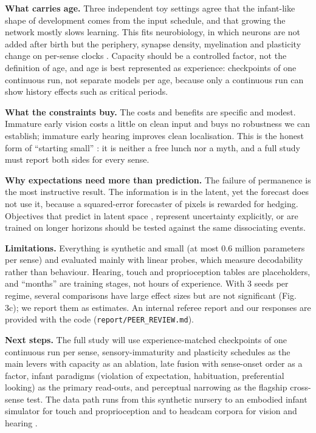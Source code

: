 \documentclass[
]{article}
\begin{document}
\textbf{What carries age.} Three independent toy settings agree that the
infant-like shape of development comes from the input schedule, and that
growing the network mostly slows learning. This fits neurobiology, in
which neurons are not added after birth but the periphery, synapse
density, myelination and plasticity change on per-sense clocks
\citep{huttenlocher1997regional, sydnor2021neurodevelopment, hensch2005critical}.
Capacity should be a controlled factor, not the definition of age, and
age is best represented as experience: checkpoints of one continuous
run, not separate models per age, because only a continuous run can show
history effects such as critical periods.

\textbf{What the constraints buy.} The costs and benefits are specific
and modest. Immature early vision costs a little on clean input and buys
no robustness we can establish; immature early hearing improves clean
localisation. This is the honest form of ``starting small''
\citep{elman1993learning, rohde1999language}: it is neither a free lunch
nor a myth, and a full study must report both sides for every sense.

\textbf{Why expectations need more than prediction.} The failure of
permanence is the most instructive result. The information is in the
latent, yet the forecast does not use it, because a squared-error
forecaster of pixels is rewarded for hedging. Objectives that predict in
latent space \citep{garrido2025intuitive}, represent uncertainty
explicitly, or are trained on longer horizons should be tested against
the same dissociating events.

\textbf{Limitations.} Everything is synthetic and small (at most 0.6
million parameters per sense) and evaluated mainly with linear probes,
which measure decodability rather than behaviour. Hearing, touch and
proprioception tables are placeholders, and ``months'' are training
stages, not hours of experience. With 3 seeds per regime, several
comparisons have large effect sizes but are not significant (Fig. 3c);
we report them as estimates. An internal referee report and our
responses are provided with the code (\texttt{report/PEER\_REVIEW.md}).

\textbf{Next steps.} The full study will use experience-matched
checkpoints of one continuous run per sense, sensory-immaturity and
plasticity schedules as the main levers with capacity as an ablation,
late fusion with sense-onset order as a factor, infant paradigms
(violation of expectation, habituation, preferential looking) as the
primary read-outs, and perceptual narrowing as the flagship cross-sense
test. The data path runs from this synthetic nursery to an embodied
infant simulator for touch and proprioception \citep{mattern2023mimo}
and to headcam corpora for vision and hearing
\citep{sullivan2021saycam, long2024babyview}.
\end{document}
